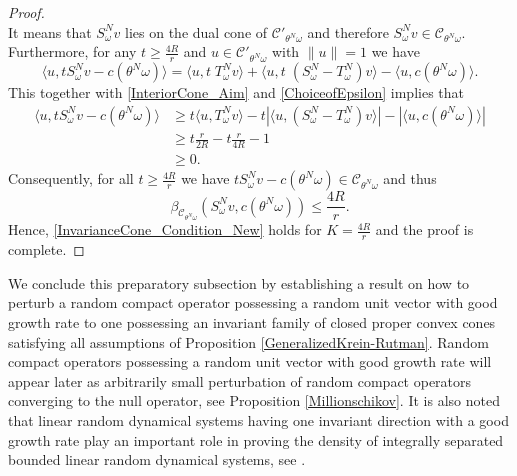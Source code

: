\documentclass[pdflatex,sn-mathphys-num]{sn-jnl}%
\theoremstyle{thmstyleone}%
\theoremstyle{thmstyletwo}%
\theoremstyle{thmstylethree}%
\newcommand{\cC}{\mathcal{C}}
\numberwithin{equation}{section}
\begin{document}
\begin{proof}
\[\]
It means that $S^N_{\omega}v$ lies on the dual cone of $ \cC'_{\theta^N\omega}$ and therefore $S^N_{\omega}v\in \cC_{\theta^N\omega}$. Furthermore, for any $t\geq \frac{4R}{r}$ and 
$u\in \cC'_{\theta^N\omega}$ with $\|u\|=1$ we have 
\[
\langle u, t S^N_{\omega}v-c(\theta^N\omega)\rangle
=
\langle u, t\; T^N_{\omega}v\rangle + \langle u, t\; (S^N_{\omega}-T^N_{\omega})v\rangle - \langle u,c(\theta^N\omega)\rangle.
\]
This together with \eqref{InteriorCone_Aim} and \eqref{ChoiceofEpsilon} implies that 
\begin{align*}
\langle u, t S^N_{\omega}v-c(\theta^N\omega)\rangle
& \geq 
t \langle u, T^N_{\omega}v\rangle
-t \left|\langle u,  (S^N_{\omega}-T^N_{\omega})v\rangle\right|-\left| \langle u,c(\theta^N\omega)\rangle \right|\\
& \geq 
t\frac{r}{2R}- t \frac{r}{4R}-1\\
& \geq 0.
\end{align*}
Consequently, for all $t\geq \frac{4R}{r}$ we have 
$tS^N_{\omega}v-c(\theta^N\omega)\in \cC_{\theta^N\omega}$ and thus 
\[
\beta_{\cC_{\theta^N\omega}}(S^N_{\omega}v,c(\theta^N\omega)) \leq \frac{4R}{r}.
\]
Hence, \eqref{InvarianceCone_Condition_New} holds for $K=\frac{4R}{r}$ and the proof is complete.
\end{proof}
%
We conclude this preparatory subsection by establishing a result on how to perturb a  random compact operator possessing a random unit vector with good growth rate to one possessing an invariant family of closed proper convex cones satisfying all assumptions of Proposition \ref{GeneralizedKrein-Rutman}. Random compact operators possessing a random unit vector with good growth rate will appear later as arbitrarily small perturbation of random compact operators converging to the null operator, see Proposition \ref{Millionschikov}. It is also noted that linear random dynamical systems having one invariant direction with a good growth rate play an important role in proving the density of integrally separated bounded linear random dynamical systems, see \cite[Theorem 6]{Cong05}.
%
%
\end{document}

